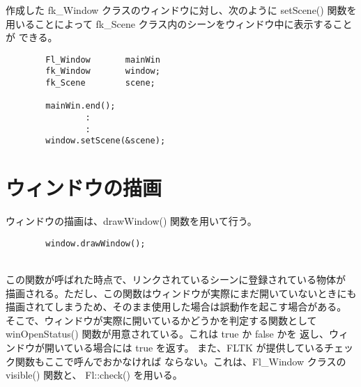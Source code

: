 作成した fk\_Window クラスのウィンドウに対し、次のように
setScene() 関数を用いることによって
fk\_Scene クラス内のシーンをウィンドウ中に表示することが
できる。
\\
\begin{breakbox}
\begin{verbatim}
        Fl_Window       mainWin
        fk_Window       window;
        fk_Scene        scene;

        mainWin.end();
                :
                :
        window.setScene(&scene);
\end{verbatim}
\end{breakbox}
\section{ウィンドウの描画}
ウィンドウの描画は、drawWindow() 関数を用いて行う。
\\
\begin{screen}
\begin{verbatim}
        window.drawWindow();
\end{verbatim}
\end{screen}
~ \\
この関数が呼ばれた時点で、リンクされているシーンに登録されている物体が
描画される。ただし、この関数はウィンドウが実際にまだ開いていないときにも
描画されてしまうため、そのまま使用した場合は誤動作を起こす場合がある。
そこで、ウィンドウが実際に開いているかどうかを判定する関数として
winOpenStatus() 関数が用意されている。これは true か false かを
返し、ウィンドウが開いている場合には true を返す。
また、FLTK が提供しているチェック関数もここで呼んでおかなければ
ならない。これは、Fl\_Window クラスの visible() 関数と、
Fl::check() を用いる。

